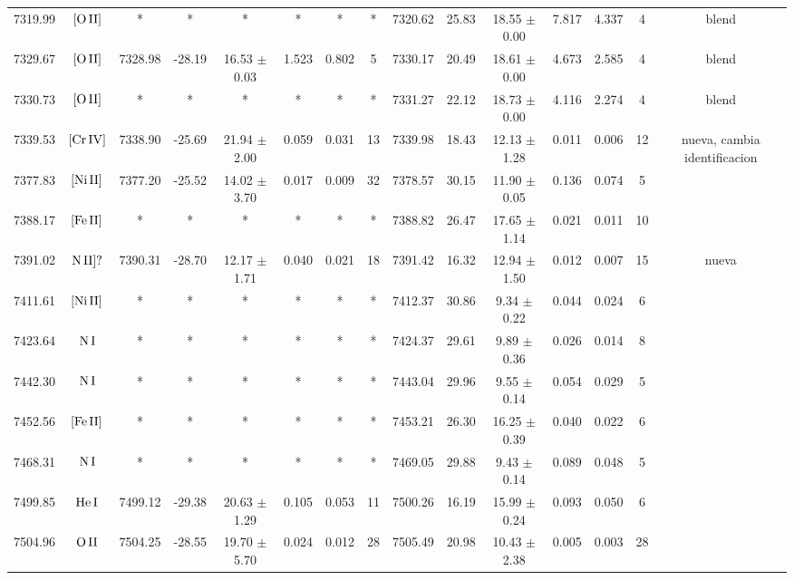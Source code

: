 \documentclass{article}
\begin{document}
\begin{table*}
\begin{adjustbox}{width=\textwidth}
\begin{tabular}{ccccccccccccccc}
7319.99 & $\mbox{[O}\thinspace \mbox{II]}$ & * & * & * & * & * & * & 7320.62 & 25.83 & 18.55 $\pm$ 0.00 & 7.817 & 4.337 & 4 &  blend \\
7329.67 & $\mbox{[O}\thinspace \mbox{II]}$ & 7328.98 & -28.19 & 16.53 $\pm$ 0.03 & 1.523 & 0.802 & 5 & 7330.17 & 20.49 & 18.61 $\pm$ 0.00 & 4.673 & 2.585 & 4 &  blend \\
7330.73 & $\mbox{[O}\thinspace \mbox{II]}$ & * & * & * & * & * & * & 7331.27 & 22.12 & 18.73 $\pm$ 0.00 & 4.116 & 2.274 & 4 &  blend \\
7339.53 & $\mbox{[Cr}\thinspace \mbox{IV]}$ & 7338.90 & -25.69 & 21.94 $\pm$ 2.00 & 0.059 & 0.031 & 13 & 7339.98 & 18.43 & 12.13 $\pm$ 1.28 & 0.011 & 0.006 & 12 &  nueva, cambia identificacion \\
7377.83 & $\mbox{[Ni}\thinspace \mbox{II]}$ & 7377.20 & -25.52 & 14.02 $\pm$ 3.70 & 0.017 & 0.009 & 32 & 7378.57 & 30.15 & 11.90 $\pm$ 0.05 & 0.136 & 0.074 & 5 &  \\
7388.17 & $\mbox{[Fe}\thinspace \mbox{II]}$ & * & * & * & * & * & * & 7388.82 & 26.47 & 17.65 $\pm$ 1.14 & 0.021 & 0.011 & 10 &  \\
7391.02 & $\mbox{N}\thinspace \mbox{II]?}$ & 7390.31 & -28.70 & 12.17 $\pm$ 1.71 & 0.040 & 0.021 & 18 & 7391.42 & 16.32 & 12.94 $\pm$ 1.50 & 0.012 & 0.007 & 15 &  nueva \\
7411.61 & $\mbox{[Ni}\thinspace \mbox{II]}$ & * & * & * & * & * & * & 7412.37 & 30.86 & 9.34 $\pm$ 0.22 & 0.044 & 0.024 & 6 &  \\
7423.64 & $\mbox{N}\thinspace \mbox{I}$ & * & * & * & * & * & * & 7424.37 & 29.61 & 9.89 $\pm$ 0.36 & 0.026 & 0.014 & 8 &  \\
7442.30 & $\mbox{N}\thinspace \mbox{I}$ & * & * & * & * & * & * & 7443.04 & 29.96 & 9.55 $\pm$ 0.14 & 0.054 & 0.029 & 5 &  \\
7452.56 & $\mbox{[Fe}\thinspace \mbox{II]}$ & * & * & * & * & * & * & 7453.21 & 26.30 & 16.25 $\pm$ 0.39 & 0.040 & 0.022 & 6 &  \\
7468.31 & $\mbox{N}\thinspace \mbox{I}$ & * & * & * & * & * & * & 7469.05 & 29.88 & 9.43 $\pm$ 0.14 & 0.089 & 0.048 & 5 &  \\
7499.85 & $\mbox{He}\thinspace \mbox{I}$ & 7499.12 & -29.38 & 20.63 $\pm$ 1.29 & 0.105 & 0.053 & 11 & 7500.26 & 16.19 & 15.99 $\pm$ 0.24 & 0.093 & 0.050 & 6 &  \\
7504.96 & $\mbox{O}\thinspace \mbox{II}$ & 7504.25 & -28.55 & 19.70 $\pm$ 5.70 & 0.024 & 0.012 & 28 & 7505.49 & 20.98 & 10.43 $\pm$ 2.38 & 0.005 & 0.003 & 28 &  \\

\end{tabular}
\end{adjustbox}
\end{table*}
\end{document}
